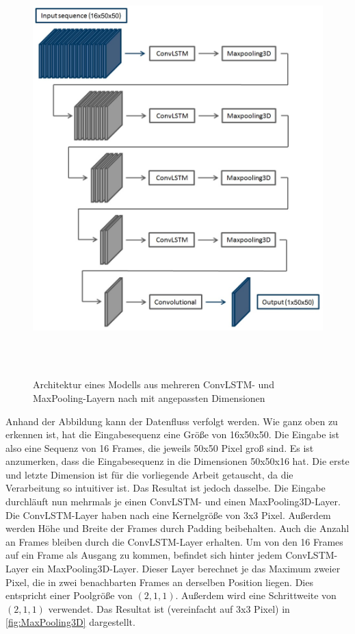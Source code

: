 \begin{figure}[ht!]
    \centering
    \includegraphics[width=1.0\textwidth,height=16cm,keepaspectratio=true]{content/images/ArchCrimeConvLSTM.jpeg}
    \caption{Architektur eines Modells aus mehreren ConvLSTM- und MaxPooling-Layern nach \cite[Figure 2.1]{CrimeConvLSTM} mit angepassten Dimensionen}
    \label{fig:ArchCrimeConvLSTM}
\end{figure}

Anhand der Abbildung kann der Datenfluss verfolgt werden.
Wie ganz oben zu erkennen ist, hat die Eingabesequenz eine Größe von 16x50x50.
Die Eingabe ist also eine Sequenz von 16 Frames, die jeweils 50x50 Pixel groß sind.
Es ist anzumerken, dass die Eingabesequenz in \cite{CrimeConvLSTM} die Dimensionen 50x50x16 hat.
Die erste und letzte Dimension ist für die vorliegende Arbeit getauscht, da die Verarbeitung so intuitiver ist.
Das Resultat ist jedoch dasselbe.
Die Eingabe durchläuft nun mehrmals je einen ConvLSTM- und einen MaxPooling3D-Layer.
Die ConvLSTM-Layer haben nach \cite{CrimeConvLSTM} eine Kernelgröße von 3x3 Pixel.
Außerdem werden Höhe und Breite der Frames durch Padding beibehalten.
Auch die Anzahl an Frames bleiben durch die ConvLSTM-Layer erhalten.
Um von den 16 Frames auf ein Frame als Ausgang zu kommen, befindet sich hinter jedem ConvLSTM-Layer ein MaxPooling3D-Layer.
Dieser Layer berechnet je das Maximum zweier Pixel, die in zwei benachbarten Frames an derselben Position liegen.
Dies entspricht einer Poolgröße von $(2, 1, 1)$.
Außerdem wird eine Schrittweite von $(2, 1, 1)$ verwendet.
Das Resultat ist (vereinfacht auf 3x3 Pixel) in \autoref{fig:MaxPooling3D} dargestellt.

